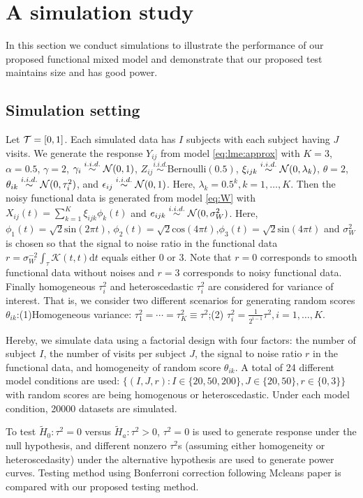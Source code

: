 \section{A simulation study}
In this section we conduct simulations to  illustrate the performance of our proposed functional mixed model and demonstrate that our proposed test maintains size and has good power.


\subsection{Simulation setting}
Let $\mathcal{T}=[0,1]$. Each simulated data has $I$ subjects with each subject having $J$ visits.
We generate the response $Y_{ij}$
from model \eqref{eq:lme:approx} with $K=3$, $\alpha = 0.5$,
 $\gamma = 2$,
 $\gamma_i \overset{i.i.d.}{\sim} \mathcal{N}(0, 1)$,
 $Z_{ij} \overset{i.i.d.}{\sim} \text{Bernoulli}(0.5)$,
  $\xi_{ijk} \overset{i.i.d.}{\sim} \mathcal{N}(0,\lambda_k)$,
  $\theta = 2$, $\theta_{ik} \overset{i.i.d.}{\sim} \mathcal{N}(0, \tau_i^2)$,
  and  $\epsilon_{ij} \overset{i.i.d.}{\sim} \mathcal{N}(0, 1)$.
  Here, $\lambda_k=0.5^k, k=1,\dots, K$.
 Then the noisy functional data is generated from model \eqref{eq:W}
with $X_{ij}(t) = \sum_{k=1}^K \xi_{ijk} \phi_k(t)$ 
and $e_{ijk}\overset{i.i.d.}{\sim}\mathcal{N}(0,\sigma_W^2)$.
Here, $\phi_1 (t)=\sqrt{2}\mathrm{sin}(2\pi t)$, $\phi_2 (t)=\sqrt{2}\mathrm{cos}(4\pi t)$,$\phi_3 (t)=\sqrt{2}\mathrm{sin}(4\pi t)$ and  $\sigma_W^2$ is chosen so 
that the signal to noise ratio in the functional data $r = \sigma_W^{-2}\int_{\tau} \mathcal{K}(t,t) \mathrm{d}t$
equals either 0 or 3. Note that $r=0$ corresponds to smooth functional data without noises and 
$r=3$ corresponds to noisy functional data. Finally homogeneous $\tau_i^2$ and heteroscedastic $\tau_i^2$ are considered for variance of interest. That is, we consider two different scenarios for generating random scores $\theta_{ik}$:(1)Homogeneous variance: $\tau_1^2=\cdots=\tau_K^2 \equiv \tau^2$;(2) $\tau_i^2=\frac{1}{2^{i-1}}\tau^2, i=1,\dots, K$. 

Hereby, we simulate data using a factorial design with four factors: the number of subject $I$, the number of visits per subject $J$, the signal to noise ratio $r$ in the functional data, and homogeneity of random score $\theta_{ik}$. A total of 24 different model conditions
are used: $\{(I,J, r):I\in\{ 20,50,200\}, J\in \{20,50\}, r\in\{0,3\} \}$ with random scores are being homogenous or heteroscedastic.
Under each model condition, 20000 datasets are simulated.

 To test $\tilde{H}_0: \tau^2=0$ versus $\tilde{H}_a: \tau^2>0$,  $\tau^2=0$ is used to generate response under the null hypothesis, and different nonzero $\tau^2$s (assuming either homogeneity or heteroscedasity) under the alternative hypothesis are used to generate  power curves. Testing method using Bonferroni correction following Mcleans paper is compared with our proposed testing method.%

